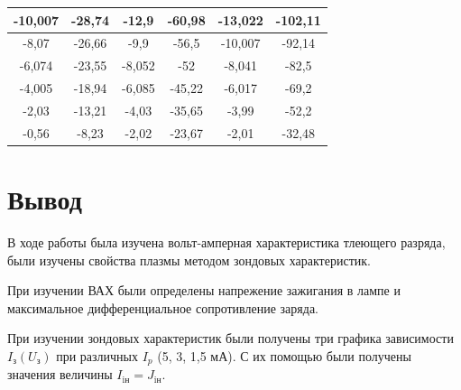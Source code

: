 \documentclass[a4paper]{article}
\theoremstyle{definition}
\theoremstyle{remark}
\begin{document}
\begin{table}[h!]
\begin{tabular}{|c|c|c|c|c|c|}
        -10,007      & -28,74        & -12,9       & -60,98      & -13,022     & -102,11     \\ \hline
        -8,07        & -26,66        & -9,9        & -56,5       & -10,007     & -92,14      \\ \hline
        -6,074       & -23,55        & -8,052      & -52         & -8,041      & -82,5       \\ \hline
        -4,005       & -18,94        & -6,085      & -45,22      & -6,017      & -69,2       \\ \hline
        -2,03        & -13,21        & -4,03       & -35,65      & -3,99       & -52,2       \\ \hline
        -0,56        & -8,23         & -2,02       & -23,67      & -2,01       & -32,48      \\ \hline
        \end{tabular}
        \end{table}

\section{Вывод}

        В ходе работы была изучена вольт-амперная характеристика тлеющего разряда, были изучены свойства плазмы методом зондовых характеристик. \medskip

        При изучении ВАХ были определены напрежение зажигания в лампе и максимальное дифференциальное сопротивление заряда. \medskip

        При изучении зондовых характеристик были получены три графика зависимости $I_{\text{з}}(U_{\text{з}})$ при различных $I_p$ (5, 3, 1,5 мА). С их помощью были получены значения величины $I_{\text{iн}} = J_{\text{iн}}$. \medskip
\end{document}
